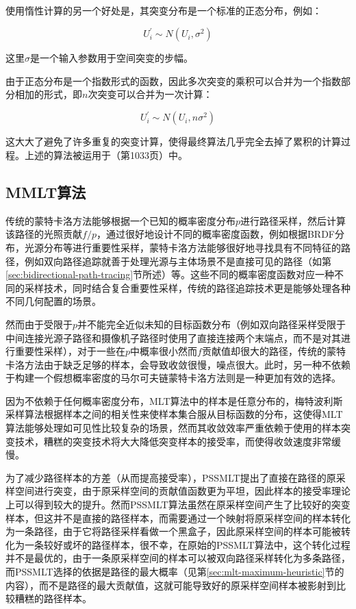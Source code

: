 使用惰性计算的另一个好处是，其突变分布是一个标准的正态分布，例如：

\begin{equation}
	U^{'}_i\sim N(U_i,\sigma^{2})
\end{equation}

\noindent 这里$\sigma$是一个输入参数用于空间突变的步幅。

由于正态分布是一个指数形式的函数，因此多次突变的乘积可以合并为一个指数部分相加的形式，即$n$次突变可以合并为一次计算：

\begin{equation}
	U^{'}_i\sim N(U_i,n\sigma^{2})
\end{equation}

\noindent 这大大了避免了许多重复的突变计算，使得最终算法几乎完全去掉了累积的计算过程。上述的算法被运用于\cite{b:pbrt}（第1033页）中。





\subsection{MMLT算法}\label{sec:mlt-mmlt}
传统的蒙特卡洛方法能够根据一个已知的概率密度分布$p$进行路径采样，然后计算该路径的光照贡献$f/p$，通过很好地设计不同的概率密度函数，例如根据BRDF分布，光源分布等进行重要性采样，蒙特卡洛方法能够很好地寻找具有不同特征的路径，例如双向路径追踪就善于处理光源与主体场景不是直接可见的路径（如第\ref{sec:bidirectional-path-tracing}节所述）等。这些不同的概率密度函数对应一种不同的采样技术，同时结合复合重要性采样，传统的路径追踪技术更是能够处理各种不同几何配置的场景。

然而由于受限于$p$并不能完全近似未知的目标函数分布（例如双向路径采样受限于中间连接光源子路径和摄像机子路径时使用了直接连接两个末端点，而不是对其进行重要性采样），对于一些在$p$中概率很小然而$f$贡献值却很大的路径，传统的蒙特卡洛方法由于缺乏足够的样本，会导致收敛很慢，噪点很大。此时，另一种不依赖于构建一个假想概率密度的马尔可夫链蒙特卡洛方法则是一种更加有效的选择。

因为不依赖于任何概率密度分布，MLT算法中的样本是任意分布的，梅特波利斯采样算法根据样本之间的相关性来使样本集合服从目标函数的分布，这使得MLT算法能够处理如可见性比较复杂的场景，然而其收敛效率严重依赖于使用的样本突变技术，糟糕的突变技术将大大降低突变样本的接受率，而使得收敛速度非常缓慢。

为了减少路径样本的方差（从而提高接受率），PSSMLT提出了直接在路径的原采样空间进行突变，由于原采样空间的贡献值函数更为平坦，因此样本的接受率理论上可以得到较大的提升。然而PSSMLT算法虽然在原采样空间产生了比较好的突变样本，但这并不是直接的路径样本，而需要通过一个映射将原采样空间的样本转化为一条路径，由于它将路径采样看做一个黑盒子，因此原采样空间的样本可能被转化为一条较好或坏的路径样本，很不幸，在原始的PSSMLT算法中，这个转化过程并不是最优的，由于一条原采样空间的样本可以被双向路径采样转化为多条路径，而PSSMLT选择的依据是路径的最大概率（见第\ref{sec:mlt-maximum-heuristic}节的内容），而不是路径的最大贡献值，这就可能导致好的原采样空间样本被影射到比较糟糕的路径样本。

